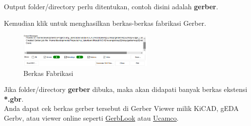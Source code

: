 \documentclass[12pt]{book}
\begin{document}
	Output folder/directory perlu ditentukan, contoh disini adalah \textbf{gerber}.

	Kemudian klik  untuk menghasilkan berkas-berkas fabrikasi Gerber.

	\newpage
	\begin{figure}[!ht]
		\centering
		\includegraphics[width=0.6\textwidth]{images/fab/fab_1}
		\caption{Berkas Fabrikasi}
	\end{figure}

	Jika folder/directory \textbf{gerber} dibuka, maka akan didapati banyak berkas ekstensi \textbf{*.gbr}.\\

	Anda dapat cek berkas gerber tersebut di Gerber Viewer milik KiCAD, gEDA Gerbv,
	atau viewer online seperti \href{https://gerblook.org/}{GerbLook} atau \href{https://gerber.ucamco.com/}{Ucamco}.
\end{document}
